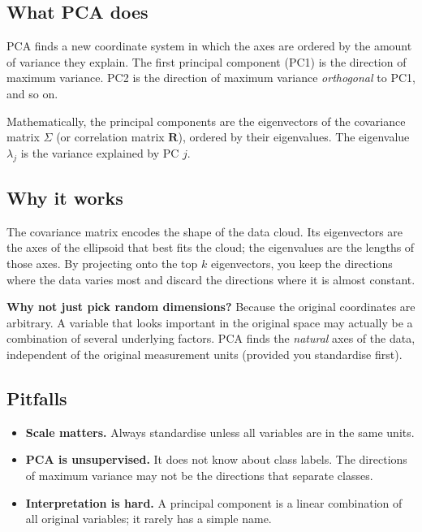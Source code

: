 \documentclass[11pt,a4paper]{article}
\newcommand{\mat}[1]{\mathbf{#1}}
\begin{document}
\subsection{What PCA does}
PCA finds a new coordinate system in which the axes are ordered by
the amount of variance they explain.  The first principal component
(PC1) is the direction of maximum variance.  PC2 is the direction of
maximum variance \emph{orthogonal} to PC1, and so on.

Mathematically, the principal components are the eigenvectors of the
covariance matrix $\Sigma$ (or correlation matrix $\mat{R}$), ordered
by their eigenvalues.  The eigenvalue $\lambda_j$ is the variance
explained by PC $j$.

\subsection{Why it works}
The covariance matrix encodes the shape of the data cloud.  Its
eigenvectors are the axes of the ellipsoid that best fits the cloud;
the eigenvalues are the lengths of those axes.  By projecting onto
the top $k$ eigenvectors, you keep the directions where the data
varies most and discard the directions where it is almost constant.

\textbf{Why not just pick random dimensions?}  Because the original
coordinates are arbitrary.  A variable that looks important in the
original space may actually be a combination of several underlying
factors.  PCA finds the \emph{natural} axes of the data, independent
of the original measurement units (provided you standardise first).

\subsection{Pitfalls}
\begin{itemize}
    \item \textbf{Scale matters.}  Always standardise unless all
          variables are in the same units.
    \item \textbf{PCA is unsupervised.}  It does not know about class
          labels.  The directions of maximum variance may not be the
          directions that separate classes.
    \item \textbf{Interpretation is hard.}  A principal component is a
          linear combination of all original variables; it rarely has
          a simple name.
\end{itemize}
\end{document}

